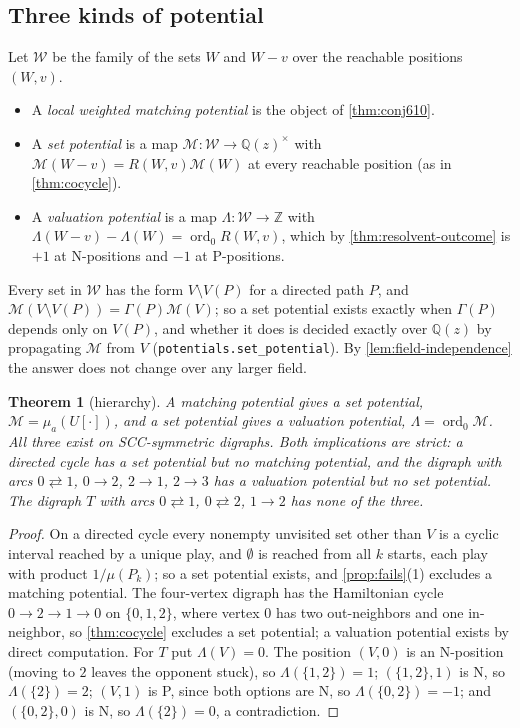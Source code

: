 \documentclass[11pt]{amsart}
\theoremstyle{plain}
\newtheorem{theorem}{Theorem}[section]
\theoremstyle{definition}
\theoremstyle{remark}
\numberwithin{equation}{section}
\newcommand{\code}[1]{{\ttfamily\nolinkurl{#1}}}
\newcommand{\ZZ}{\mathbb{Z}}
\newcommand{\QQ}{\mathbb{Q}}
\newcommand{\Qz}{\QQ(z)}
\newcommand{\Mpot}{\mathcal{M}}           %
\newcommand{\ord}{\operatorname{ord}}
\begin{document}
\subsection{Three kinds of potential}\label{ssec:hierarchy}
Let $\mathcal W$ be the family of the sets $W$ and $W-v$ over the reachable positions $(W,v)$.
\begin{itemize}
\item A \emph{local weighted matching potential} is the object of \cref{thm:conj610}.
\item A \emph{set potential} is a map $\Mpot\colon\mathcal W\to\Qz^{\times}$ with $\Mpot(W-v)=R(W,v)\Mpot(W)$ at every reachable position (as in \cref{thm:cocycle}).
\item A \emph{valuation potential} is a map $\Lambda\colon\mathcal W\to\ZZ$ with $\Lambda(W-v)-\Lambda(W)=\ord_0R(W,v)$, which by \cref{thm:resolvent-outcome} is $+1$ at N-positions and $-1$ at P-positions.
\end{itemize}
Every set in $\mathcal W$ has the form $V\setminus V(P)$ for a directed path $P$, and $\Mpot(V\setminus V(P))=\Gamma(P)\Mpot(V)$; so a set potential exists exactly when $\Gamma(P)$ depends only on $V(P)$, and whether it does is decided exactly over $\Qz$ by propagating $\Mpot$ from $V$ (\code{potentials.set_potential}). By \cref{lem:field-independence} the answer does not change over any larger field.

\begin{theorem}[hierarchy]\label{thm:hierarchy}
A matching potential gives a set potential, $\Mpot=\mu_a(U[\cdot])$, and a set potential gives a valuation potential, $\Lambda=\ord_0\Mpot$. All three exist on SCC-symmetric digraphs. Both implications are strict: a directed cycle has a set potential but no matching potential, and the digraph with arcs $0\rightleftarrows1$, $0\to2$, $2\to1$, $2\to3$ has a valuation potential but no set potential. The digraph $T$ with arcs $0\rightleftarrows1$, $0\rightleftarrows2$, $1\to2$ has none of the three.
\end{theorem}
\begin{proof}
On a directed cycle every nonempty unvisited set other than $V$ is a cyclic interval reached by a unique play, and $\emptyset$ is reached from all $k$ starts, each play with product $1/\mu(P_k)$; so a set potential exists, and \cref{prop:fails}(1) excludes a matching potential. The four-vertex digraph has the Hamiltonian cycle $0\to2\to1\to0$ on $\{0,1,2\}$, where vertex $0$ has two out-neighbors and one in-neighbor, so \cref{thm:cocycle} excludes a set potential; a valuation potential exists by direct computation. For $T$ put $\Lambda(V)=0$. The position $(V,0)$ is an N-position (moving to $2$ leaves the opponent stuck), so $\Lambda(\{1,2\})=1$; $(\{1,2\},1)$ is N, so $\Lambda(\{2\})=2$; $(V,1)$ is P, since both options are N, so $\Lambda(\{0,2\})=-1$; and $(\{0,2\},0)$ is N, so $\Lambda(\{2\})=0$, a contradiction.
\end{proof}
\end{document}
